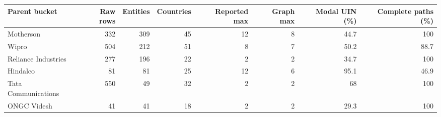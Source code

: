 \begin{tabular}{lrrrrrrr}
\toprule
Parent bucket & Raw rows & Entities & Countries & Reported max & Graph max & Modal UIN (\%) & Complete paths (\%) \\
\midrule
Motherson & 332 & 309 & 45 & 12 & 8 & 44.7 & 100 \\
Wipro & 504 & 212 & 51 & 8 & 7 & 50.2 & 88.7 \\
Reliance Industries & 277 & 196 & 22 & 2 & 2 & 34.7 & 100 \\
Hindalco & 81 & 81 & 25 & 12 & 6 & 95.1 & 46.9 \\
Tata Communications & 550 & 49 & 32 & 2 & 2 & 68 & 100 \\
ONGC Videsh & 41 & 41 & 18 & 2 & 2 & 29.3 & 100 \\
\bottomrule
\end{tabular}
